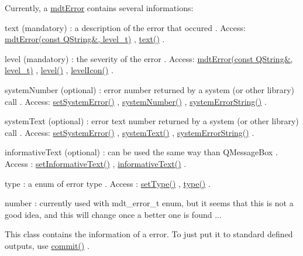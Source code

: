 Currently, a \hyperlink{classmdt_error}{mdt\-Error} contains several informations\-:
\begin{DoxyItemize}
\item text (mandatory) \-: a description of the error that occured . Access\-: \hyperlink{classmdt_error_a775542a251ef746f3433e7d790a48d85}{mdt\-Error(const Q\-String\&, level\-\_\-t)} , \hyperlink{classmdt_error_a8630bb6b21b70edfe3d13eaff82a1baf}{text()} .
\item level (mandatory) \-: the severity of the error . Access\-: \hyperlink{classmdt_error_a775542a251ef746f3433e7d790a48d85}{mdt\-Error(const Q\-String\&, level\-\_\-t)} , \hyperlink{classmdt_error_a8d8382d3008de890689df415deb7766e}{level()} , \hyperlink{classmdt_error_aac5a7cec9a5d4364f9331c80e1eafe99}{level\-Icon()} .
\item system\-Number (optional) \-: error number returned by a system (or other library) call . Access\-: \hyperlink{classmdt_error_a49254fdb566fee1a4adafe6a3694befc}{set\-System\-Error()} , \hyperlink{classmdt_error_a1be3f45cd56b3142f50c288df9f53204}{system\-Number()} , \hyperlink{classmdt_error_a28d22c0b9341faacfef22a7deae2da3c}{system\-Error\-String()} .
\item system\-Text (optional) \-: error text number returned by a system (or other library) call . Access\-: \hyperlink{classmdt_error_a49254fdb566fee1a4adafe6a3694befc}{set\-System\-Error()} , \hyperlink{classmdt_error_a6cd449e657f321b86d234269b5e92cda}{system\-Text()} , \hyperlink{classmdt_error_a28d22c0b9341faacfef22a7deae2da3c}{system\-Error\-String()} .
\item informative\-Text (optional) \-: can be used the same way than Q\-Message\-Box . Access \-: \hyperlink{classmdt_error_a8ef108a0502df7875f1b54bbb2a8919d}{set\-Informative\-Text()} , \hyperlink{classmdt_error_adcc1905f585c327cec8a2e31af616651}{informative\-Text()} .
\item type \-: a enum of error type . Access \-: \hyperlink{classmdt_error_afcd233ddf578da2414f8e43c114bcec2}{set\-Type()} , \hyperlink{classmdt_error_a0eb767baa3172dfff7241d58dd0288d5}{type()} .
\end{DoxyItemize}

number \-: currently used with mdt\-\_\-error\-\_\-t enum, but it seems that this is not a good idea, and this will change once a better one is found ...

This class contains the information of a error. To just put it to standard defined outputs, use \hyperlink{classmdt_error_ad3cccf7c7f7d4bdabdcb4e60794bb9cb}{commit()} .

